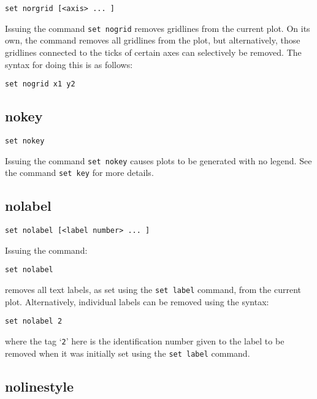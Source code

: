 \begin{verbatim}
set norgrid [<axis> ... ]
\end{verbatim}

Issuing the command {\tt set nogrid} removes gridlines from the current plot. On
its own, the command removes all gridlines from the plot, but alternatively,
those gridlines connected to the ticks of certain axes can selectively be
removed.  The syntax for doing this is as follows:

\begin{verbatim}
set nogrid x1 y2
\end{verbatim}


\subsection{nokey}

\begin{verbatim}
set nokey
\end{verbatim}

Issuing the command {\tt set nokey} causes plots to be generated with no legend.
See the command {\tt set key} for more details.


\subsection{nolabel}

\begin{verbatim}
set nolabel [<label number> ... ]
\end{verbatim}

Issuing the command:

\begin{verbatim}
set nolabel
\end{verbatim}

\noindent removes all text labels, as set using the {\tt set label} command,
from the current plot. Alternatively, individual labels can be removed using
the syntax:

\begin{verbatim}
set nolabel 2
\end{verbatim}

\noindent where the tag `{\tt 2}' here is the identification number given to
the label to be removed when it was initially set using the {\tt set label}
command.

\subsection{nolinestyle}

